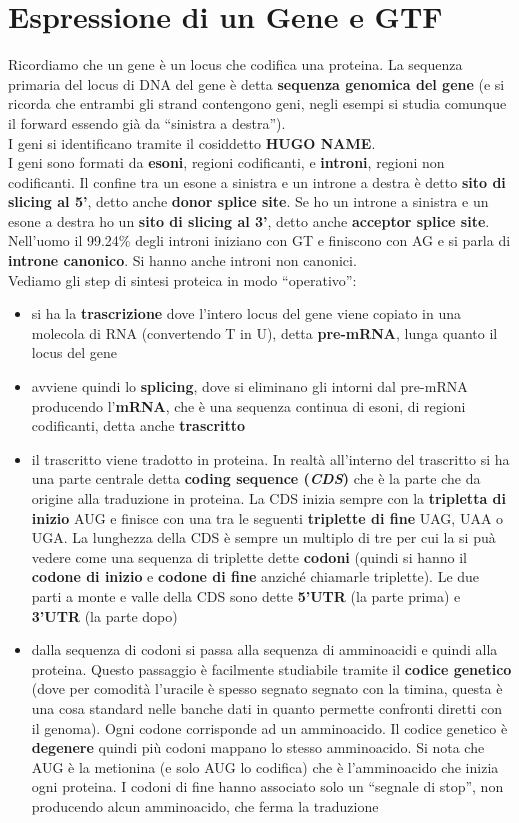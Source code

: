 \documentclass[a4paper,12pt, oneside]{book}
\begin{document}
\section{Espressione di un Gene e GTF}
Ricordiamo che un gene è un locus che codifica una proteina. La sequenza
primaria del locus di DNA del gene è detta \textbf{sequenza genomica del gene}
(e si ricorda che entrambi gli strand contengono geni, negli esempi si studia
comunque il forward essendo già da ``sinistra a destra'').\\
I geni si identificano tramite il cosiddetto \textbf{HUGO NAME}.\\
I geni sono formati da \textbf{esoni}, regioni codificanti, e
\textbf{introni}, regioni non codificanti. Il confine tra un esone a sinistra
e un introne a destra è detto \textbf{sito di slicing al 5'}, detto anche
\textbf{donor splice site}. Se ho un introne
a sinistra e un esone a destra ho un \textbf{sito di slicing al 3'}, detto
anche \textbf{acceptor splice site}. Nell'uomo il 99.24\% degli introni
iniziano con GT e finiscono con AG e si parla di \textbf{introne canonico}. Si
hanno anche introni non canonici.\\
Vediamo gli step di sintesi proteica in modo ``operativo'':
\begin{itemize}
  \item si ha la \textbf{trascrizione} dove l'intero locus del gene viene
  copiato in una molecola di RNA (convertendo T in U), detta \textbf{pre-mRNA},
  lunga quanto il locus del gene
  \item avviene quindi lo \textbf{splicing}, dove si eliminano gli intorni dal
  pre-mRNA producendo l'\textbf{mRNA}, che è una sequenza continua di esoni, di
  regioni codificanti, detta anche \textbf{trascritto}
  \item il trascritto viene tradotto in proteina. In realtà all'interno del
  trascritto si ha una parte centrale detta \textbf{coding sequence
    (\textit{CDS})} che è la parte che da origine alla traduzione in
  proteina. La CDS inizia sempre con la \textbf{tripletta di inizio} AUG e
  finisce con una tra le seguenti \textbf{triplette di fine} UAG, UAA o UGA. La
  lunghezza della CDS è sempre un multiplo di tre per cui la si puà vedere come
  una sequenza di triplette dette \textbf{codoni} (quindi si hanno il
  \textbf{codone di inizio} e \textbf{codone di fine} anziché chiamarle
  triplette). Le due parti a monte e valle della CDS sono dette \textbf{5'UTR}
  (la parte prima) e \textbf{3'UTR} (la parte dopo)
  \item dalla sequenza di codoni si passa alla sequenza di amminoacidi e quindi
  alla proteina. Questo passaggio è facilmente studiabile tramite
  il \textbf{codice genetico} (dove per comodità l'uracile è spesso segnato
  segnato con la timina, questa è una cosa standard nelle banche dati in quanto
  permette confronti diretti con il genoma). Ogni codone corrisponde ad un
  amminoacido. Il codice genetico è \textbf{degenere} quindi più codoni mappano
  lo stesso amminoacido. Si nota che AUG è la metionina (e solo AUG lo
  codifica) che è l'amminoacido che inizia ogni proteina. I codoni di fine hanno
  associato solo un ``segnale di stop'', non producendo alcun amminoacido, che
  ferma la traduzione
\end{itemize}
\end{document}
